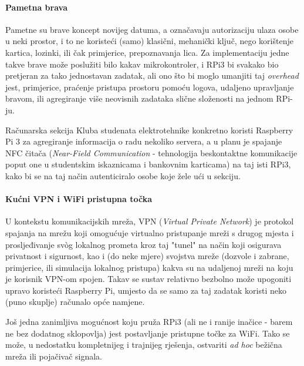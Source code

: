 \documentclass[12pt,a4paper]{article}
\begin{document}
	\paragraph{Pametna brava} %
	\label{par:smart_lock}
		Pametne su brave koncept novijeg datuma, a označavaju autorizaciju ulaza osobe u neki prostor, i to ne koristeći (samo) klasični, mehanički ključ, nego korištenje kartica, lozinki, ili čak primjerice, prepoznavanja lica. Za implementaciju jedne takve brave može poslužiti bilo kakav mikrokontroler, i RPi3 bi svakako bio pretjeran za tako jednostavan zadatak, ali ono što bi moglo umanjiti taj \textit{overhead} jest, primjerice, praćenje pristupa prostoru pomoću logova, udaljeno upravljanje bravom, ili agregiranje više neovisnih zadataka slične složenosti na jednom RPi-ju.
		\par Računarska sekcija Kluba studenata elektrotehnike konkretno koristi Raspberry Pi 3 za agregiranje informacija o radu nekoliko servera, a u planu je spajanje NFC čitača (\textit{Near-Field Communication} - tehnologija beskontaktne komunikacije poput one u studentskim iskaznicama i bankovnim karticama) na taj isti RPi3, kako bi se na taj način autenticiralo osobe koje žele ući u sekciju.


	\paragraph{Kućni VPN i WiFi pristupna točka} %
	\label{par:home_vpn}
		U kontekstu komunikacijskih mreža, VPN (\textit{Virtual Private Network}) je protokol spajanja na mrežu koji omogućuje virtualno pristupanje mreži s drugog mjesta i prosljeđivanje svòg lokalnog prometa kroz taj "tunel" na način koji osigurava privatnost i sigurnost, kao i (do neke mjere) svojstva mreže (dozvole i zabrane, primjerice, ili simulacija lokalnog pristupa) kakva su na udaljenoj mreži na koju je korisnik VPN-om spojen. Takav se sustav relativno bezbolno može upogoniti upravo koristeći Raspberry Pi, umjesto da se samo za taj zadatak koristi neko (puno skuplje) računalo opće namjene.
		\par Još jedna zanimljiva mogućnost koju pruža RPi3 (ali ne i ranije inačice - barem ne bez dodatnog sklopovlja) jest postavljanje pristupne točke za WiFi. Tako se može, u nedostatku kompletnijeg i trajnijeg rješenja, ostvariti \textit{ad hoc} bežična mreža ili pojačivač signala.

\end{document}
